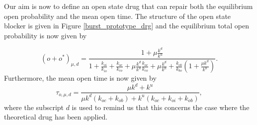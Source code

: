 Our aim is now to define an open state drug that can repair both the
equilibrium open probability and the mean open time. The structure of the open
state blocker is given in Figure \ref{burst_prototype_drg} and the equilibrium total open probability is now
given by 
\begin{comment}
the following system of equations:%
\begin{align*}
k_{io}i  &  =k_{oi}o,\text{ }k_{ci}c=k_{ic}i,\text{ }k_{co}c=k_{oc}o,\text{
}k_{bo}b=k_{ob}o,\\
\mu k^{d}c  &  =k^{u}c^{\ast},\text{ }\mu k^{d}o=k^{u}o^{\ast},\text{ }%
k_{bo}b^{\ast}=k_{ob}o^{\ast}.
\end{align*}
Since%
\begin{equation*}
i=\frac{k_{oi}}{k_{io}}o,\text{ }c=\frac{k_{oc}}{k_{co}}o,\text{ }c^{\ast
}=\frac{\mu k^{d}}{k^{u}}\frac{k_{oc}}{k_{co}}o,\text{ }o^{\ast}=\frac{\mu
k^{d}}{k^{u}}o,\text{ }b=\frac{k_{ob}}{k_{bo}}o,\text{ }b^{\ast}=\frac{k_{ob}%
}{k_{bo}}\frac{\mu k^{d}}{k^{u}}o
\end{equation*}
and $o+i+c+c^{\ast}+o^{\ast}+b+b^{\ast}=1,$ 
we obtain the total open probability%
\end{comment}
\begin{equation}
\left(  o+o^{\ast}\right)  _{\mu,d}=\frac{1+\mu\frac{k^{d}}{k^{u}}}{1+\frac
{k_{oi}}{k_{io}}+\frac{k_{oc}}{k_{co}}+\mu\frac{k^{d}}{k^{u}}\frac{k_{oc}%
}{k_{co}}+\mu\frac{k^{d}}{k^{u}}+\frac{k_{ob}}{k_{bo}}\left(  1+\frac{\mu
k^{d}}{k^{u}}\right)  }. \label{o300}%
\end{equation}
Furthermore, the mean open time is now given by%
\begin{equation}
\tau_{o,\mu,d}=\frac{\mu k^{d}+k^{u}}{\mu k^{d}\left(  k_{oc}+k_{ob}\right)
+k^{u}\left(  k_{oc}+k_{oi}+k_{ob}\right)  }, \label{mot300}%
\end{equation}
where the subscript $d$ is used to remind us that this concerns the case where
the theoretical drug has been applied.

\bigskip

